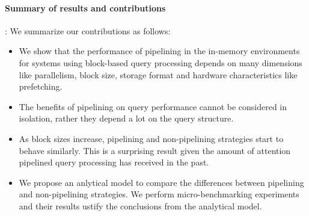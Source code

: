 \paragraph*{\bf{Summary of results and contributions}}:
%
%
We summarize our contributions as follows:
\begin{itemize}
	\item We show that the performance of pipelining in the in-memory environments for systems using block-based query processing depends on many dimensions like parallelism, block size, storage format and hardware characteristics like prefetching. 
	\item The benefits of pipelining on query performance cannot be considered in isolation, rather they depend a lot on the query structure.
	\item As block sizes increase, pipelining and non-pipelining strategies start to behave similarly. This is a surprising result given the amount of attention pipelined query processing has received in the past. 
	\item We propose an anlytical model to compare the differences between pipelining and non-pipelining strategies. We perform micro-benchmarking experiments and their results ustify the conclusions from the analytical model.
\end{itemize}
